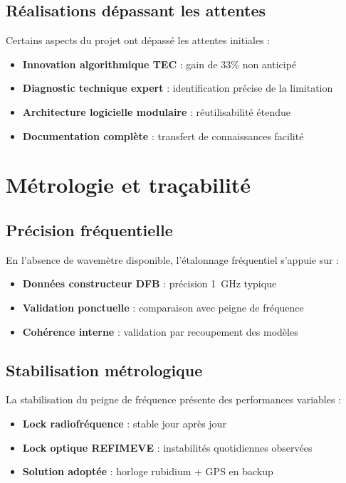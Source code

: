 \subsection{Réalisations dépassant les attentes}

Certains aspects du projet ont dépassé les attentes initiales :

\begin{itemize}
    \item \textbf{Innovation algorithmique TEC} : gain de 33\% non anticipé
    \item \textbf{Diagnostic technique expert} : identification précise de la limitation
    \item \textbf{Architecture logicielle modulaire} : réutilisabilité étendue
    \item \textbf{Documentation complète} : transfert de connaissances facilité
\end{itemize}

\section{Métrologie et traçabilité}

\subsection{Précision fréquentielle}

En l'absence de wavemètre disponible, l'étalonnage fréquentiel s'appuie sur :
\begin{itemize}
    \item \textbf{Données constructeur DFB} : précision \SI{1}{\GHz} typique
    \item \textbf{Validation ponctuelle} : comparaison avec peigne de fréquence
    \item \textbf{Cohérence interne} : validation par recoupement des modèles
\end{itemize}

\subsection{Stabilisation métrologique}

La stabilisation du peigne de fréquence présente des performances variables :
\begin{itemize}
    \item \textbf{Lock radiofréquence} : stable jour après jour
    \item \textbf{Lock optique REFIMEVE} : instabilités quotidiennes observées
    \item \textbf{Solution adoptée} : horloge rubidium + GPS en backup
\end{itemize}

